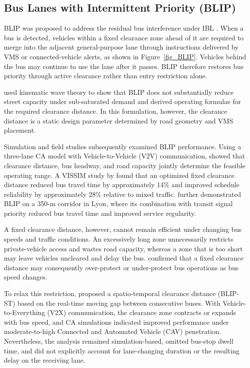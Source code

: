 \subsection{Bus Lanes with Intermittent Priority (BLIP)}

BLIP was proposed to address the residual bus interference under IBL \citep{eichler2006bus}. When a bus is detected, vehicles within a fixed clearance zone ahead of it are required to merge into the adjacent general-purpose lane through instructions delivered by VMS or connected-vehicle alerts, as shown in Figure~\ref{fig_BLIP}. Vehicles behind the bus may continue to use the lane after it passes. BLIP therefore restores bus priority through active clearance rather than entry restriction alone.

\citet{eichler2006bus} used kinematic wave theory to show that BLIP does not substantially reduce street capacity under sub-saturated demand and derived operating formulae for the required clearance distance. In this formulation, however, the clearance distance is a static design parameter determined by road geometry and VMS placement.

Simulation and field studies subsequently examined BLIP performance. Using a three-lane CA model with Vehicle-to-Vehicle (V2V) communication, \citet{wu2017evaluating} showed that clearance distance, bus headway, and road capacity jointly determine the feasible operating range. A VISSIM study by \citet{wu2018development} found that an optimized fixed clearance distance reduced bus travel time by approximately 14\% and improved schedule reliability by approximately 28\% relative to mixed traffic. \citet{chiabaut2019demonstration} further demonstrated BLIP on a 350-m corridor in Lyon, where its combination with transit signal priority reduced bus travel time and improved service regularity.

A fixed clearance distance, however, cannot remain efficient under changing bus speeds and traffic conditions. An excessively long zone unnecessarily restricts private-vehicle access and wastes road capacity, whereas a zone that is too short may leave vehicles uncleared and delay the bus. \citet{wu2022two} confirmed that a fixed clearance distance may consequently over-protect or under-protect bus operations as bus speed changes.

To relax this restriction, \citet{jiang2025analysis} proposed a spatio-temporal clearance distance (BLIP-ST) based on the real-time moving gap between consecutive buses. With Vehicle-to-Everything (V2X) communication, the clearance zone contracts or expands with bus speed, and CA simulations indicated improved performance under moderate-to-high Connected and Automated Vehicle (CAV) penetration. Nevertheless, the analysis remained simulation-based, omitted bus-stop dwell time, and did not explicitly account for lane-changing duration or the resulting delay on the receiving lane.

